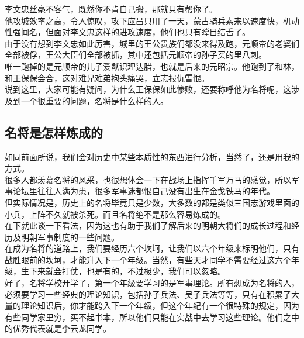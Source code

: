 \begin{multicols}{\theparacolNo}
李文忠丝毫不客气，既然你不肯自己搬，那就只有帮你了。\\

他攻城效率之高，令人惊叹，攻下应昌只用了一天，蒙古骑兵素来以速度快，机动性强闻名，但面对李文忠这样的进攻速度，他们也只有瞠目结舌了。\\

由于没有想到李文忠如此厉害，城里的王公贵族们都没来得及跑，元顺帝的老婆们全部被俘，王公大臣们全部被抓，其中还包括元顺帝的孙子买的里八刺。\\

唯一跑掉的是元顺帝的儿子爱猷识理达腊，也就是后来的元昭宗。他跑到了和林，和王保保会合，这对难兄难弟抱头痛哭，立志报仇雪恨。\\

说到这里，大家可能有疑问，为什么王保保如此惨败，还要称呼他为名将呢，这涉及到一个很重要的问题，名将是什么样的人。\\

\subsection{名将是怎样炼成的}
如同前面所说，我们会对历史中某些本质性的东西进行分析，当然了，还是用我的方式。\\

很多人都羡慕名将的风采，也很想体会一下在战场上指挥千军万马的感觉，所以军事论坛里往往人满为患，很多军事迷都恨自己没有出生在金戈铁马的年代。\\

但实际情况是，历史上的名将毕竟只是少数，大多数的都是类似三国志游戏里面的小兵，上阵不久就被杀死。而且名将绝不是那么容易炼成的。\\

在下就此谈一下看法，因为这也有助于我们了解后来的明朝大将们的成长过程和经历及明朝军事制度的一些问题。\\

在成为名将的道路上，我们要经历六个坎坷，让我们以六个年级来标明他们，只有战胜眼前的坎坷，才能升入下一个年级。当然，有些天才同学不需要经过这六个年级，生下来就会打仗，也是有的，不过极少，我们可以忽略。\\

好了，名将学校开学了，第一个年级要学习的是军事理论。所有想成为名将的人，必须要学习一些经典的理论知识，包括孙子兵法、吴子兵法等等，只有在积累了大量的理论知识后，你才能跨入下一个年级，但这个年纪有一个很特殊的规定，因为有些同学家里穷，买不起书本，所以他们只能在实战中去学习这些理论。他们之中的优秀代表就是李云龙同学。\\


\end{multicols}
